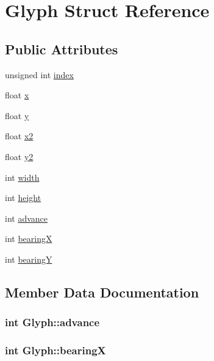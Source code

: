 \hypertarget{struct_glyph}{
\section{Glyph Struct Reference}
\label{struct_glyph}
}
\subsection*{Public Attributes}
\begin{CompactItemize}
\item 
unsigned int \hyperlink{struct_glyph_7dcbe59fb6318104fd72a0d454e4d16c}{index}
\item 
float \hyperlink{struct_glyph_cd9aac5f4edba6ff9cc1cc439696b708}{x}
\item 
float \hyperlink{struct_glyph_d8642dd12bf3fb747bfe5096a4c8a2ba}{y}
\item 
float \hyperlink{struct_glyph_f8357395b3bb61d817991553a87ba9b3}{x2}
\item 
float \hyperlink{struct_glyph_30e23523e3b8b41ef12d8a31a5558456}{y2}
\item 
int \hyperlink{struct_glyph_b2b630091a5011f0e1756899d8812c13}{width}
\item 
int \hyperlink{struct_glyph_89dab1a018cf8d684b5ce07a4645b460}{height}
\item 
int \hyperlink{struct_glyph_f5c62b10c801db6ea7e00b31b8ac4e89}{advance}
\item 
int \hyperlink{struct_glyph_d60a95d0e2ff2cb59a995293411c46de}{bearingX}
\item 
int \hyperlink{struct_glyph_5ed3b110ed3355ec56068707ba981a7b}{bearingY}
\end{CompactItemize}


\subsection{Member Data Documentation}
\hypertarget{struct_glyph_f5c62b10c801db6ea7e00b31b8ac4e89}{
\subsubsection[{advance}]{\setlength{\rightskip}{0pt plus 5cm}int {\bf Glyph::advance}}}
\label{struct_glyph_f5c62b10c801db6ea7e00b31b8ac4e89}


\hypertarget{struct_glyph_d60a95d0e2ff2cb59a995293411c46de}{
\subsubsection[{bearingX}]{\setlength{\rightskip}{0pt plus 5cm}int {\bf Glyph::bearingX}}}
\label{struct_glyph_d60a95d0e2ff2cb59a995293411c46de}


